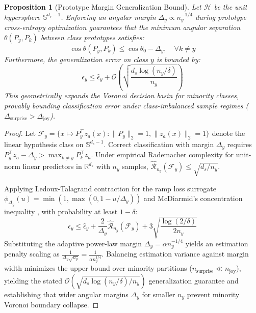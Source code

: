 \documentclass[journal,twocolumn]{article}
\newtheorem{proposition}{Proposition}
\begin{document}
\begin{proposition}[Prototype Margin Generalization Bound]
Let $\mathcal{H}$ be the unit hypersphere $\mathbb{S}^{d_s-1}$. Enforcing an angular margin $\Delta_y \propto n_y^{-1/4}$ during prototype cross-entropy optimization guarantees that the minimum angular separation $\theta(P_y, P_k)$ between class prototypes satisfies:
\begin{equation}
    \cos \theta(P_y, P_k) \le \cos \theta_0 - \Delta_y, \quad \forall k \neq y
\end{equation}
Furthermore, the generalization error on class $y$ is bounded by:
\begin{equation}
    \epsilon_y \le \hat{\epsilon}_y + \mathcal{O}\left( \sqrt{\frac{d_s \log(n_y / \delta)}{n_y}} \right)
\end{equation}
This geometrically expands the Voronoi decision basin for minority classes, provably bounding classification error under class-imbalanced sample regimes ($\Delta_{\text{surprise}} > \Delta_{\text{joy}}$).
\end{proposition}

\begin{proof}
Let $\mathcal{F}_y = \{ x \mapsto P_y^\top z_a(x) : \|P_y\|_2 = 1, \|z_a(x)\|_2 = 1 \}$ denote the linear hypothesis class on $\mathbb{S}^{d_s-1}$. Correct classification with margin $\Delta_y$ requires $P_y^\top z_a - \Delta_y > \max_{k \neq y} P_k^\top z_a$. Under empirical Rademacher complexity for unit-norm linear predictors in $\mathbb{R}^{d_s}$ with $n_y$ samples, $\hat{\mathcal{R}}_{n_y}(\mathcal{F}_y) \le \sqrt{d_s / n_y}$. 

Applying Ledoux-Talagrand contraction for the ramp loss surrogate $\phi_{\Delta_y}(u) = \min(1, \max(0, 1 - u/\Delta_y))$ and McDiarmid's concentration inequality \cite{cao2019ldam}, with probability at least $1 - \delta$:
\begin{equation}
    \epsilon_y \le \hat{\epsilon}_y + \frac{2}{\Delta_y}\hat{\mathcal{R}}_{n_y}(\mathcal{F}_y) + 3\sqrt{\frac{\log(2/\delta)}{2n_y}}
\end{equation}
Substituting the adaptive power-law margin $\Delta_y = \alpha n_y^{-1/4}$ yields an estimation penalty scaling as $\frac{1}{\Delta_y \sqrt{n_y}} = \frac{1}{\alpha n_y^{1/4}}$. Balancing estimation variance against margin width minimizes the upper bound over minority partitions ($n_{\text{surprise}} \ll n_{\text{joy}}$), yielding the stated $\mathcal{O}\left(\sqrt{d_s \log(n_y / \delta) / n_y}\right)$ generalization guarantee and establishing that wider angular margins $\Delta_y$ for smaller $n_y$ prevent minority Voronoi boundary collapse.
\end{proof}
\end{document}
